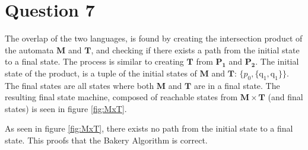 \section*{Question 7}

The overlap of the two languages, is found by creating the intersection product of the automata $\mathbf{M}$ and $\mathbf{T}$, and checking if there exists a path from the initial state to a final state. The process is similar to creating $\mathbf{T}$ from $\mathbf{P_1}$ and $\mathbf{P_2}$. The initial state of the product, is a tuple of the initial states of $\mathbf{M}$ and $\mathbf{T}$: $\{p_0, \{\mathrm{q_1, q_1}\}\}$. The final states are all states where both $\mathbf{M}$ and $\mathbf{T}$ are in a final state. The resulting final state machine, composed of reachable states from $\mathbf{M \times T}$ (and final states) is seen in figure \ref{fig:MxT}.



As seen in figure \ref{fig:MxT}, there exists no path from the initial state to a final state. This proofs that the Bakery Algorithm is correct.